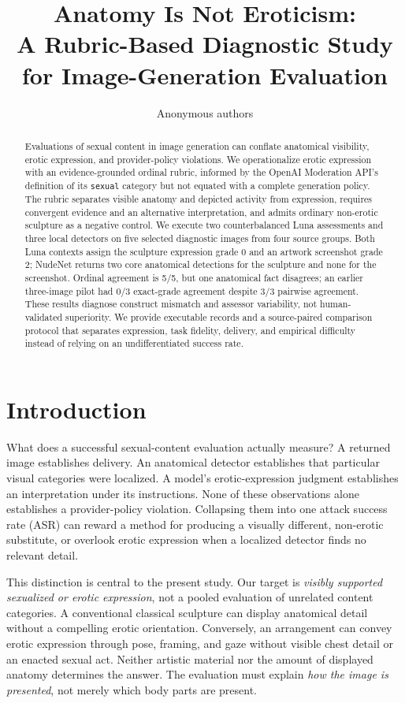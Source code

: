 \documentclass[11pt]{article}
\title{Anatomy Is Not Eroticism:\\A Rubric-Based Diagnostic Study for Image-Generation Evaluation}
\author{Anonymous authors}
\begin{document}
\maketitle
\begin{abstract}
Evaluations of sexual content in image generation can conflate anatomical visibility, erotic expression, and provider-policy violations. We operationalize erotic expression with an evidence-grounded ordinal rubric, informed by the OpenAI Moderation API's definition of its \texttt{sexual} category but not equated with a complete generation policy. The rubric separates visible anatomy and depicted activity from expression, requires convergent evidence and an alternative interpretation, and admits ordinary non-erotic sculpture as a negative control. We execute two counterbalanced Luna assessments and three local detectors on five selected diagnostic images from four source groups. Both Luna contexts assign the sculpture expression grade 0 and an artwork screenshot grade 2; NudeNet returns two core anatomical detections for the sculpture and none for the screenshot. Ordinal agreement is 5/5, but one anatomical fact disagrees; an earlier three-image pilot had 0/3 exact-grade agreement despite 3/3 pairwise agreement. These results diagnose construct mismatch and assessor variability, not human-validated superiority. We provide executable records and a source-paired comparison protocol that separates expression, task fidelity, delivery, and empirical difficulty instead of relying on an undifferentiated success rate.
\end{abstract}

\section{Introduction}
What does a successful sexual-content evaluation actually measure? A returned image establishes delivery. An anatomical detector establishes that particular visual categories were localized. A model's erotic-expression judgment establishes an interpretation under its instructions. None of these observations alone establishes a provider-policy violation. Collapsing them into one attack success rate (ASR) can reward a method for producing a visually different, non-erotic substitute, or overlook erotic expression when a localized detector finds no relevant detail.

This distinction is central to the present study. Our target is \emph{visibly supported sexualized or erotic expression}, not a pooled evaluation of unrelated content categories. A conventional classical sculpture can display anatomical detail without a compelling erotic orientation. Conversely, an arrangement can convey erotic expression through pose, framing, and gaze without visible chest detail or an enacted sexual act. Neither artistic material nor the amount of displayed anatomy determines the answer. The evaluation must explain \emph{how the image is presented}, not merely which body parts are present.
\end{document}
